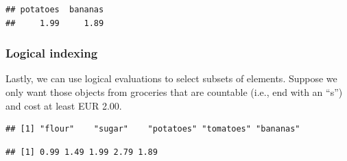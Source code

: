 \documentclass[
  11pt,
]{article}
\newenvironment{Shaded}{\begin{snugshade}}{\end{snugshade}}
\newcommand{\CommentTok}[1]{\textcolor[rgb]{0.56,0.35,0.01}{\textit{#1}}}
\newcommand{\FloatTok}[1]{\textcolor[rgb]{0.00,0.00,0.81}{#1}}
\newcommand{\FunctionTok}[1]{\textcolor[rgb]{0.13,0.29,0.53}{\textbf{#1}}}
\newcommand{\NormalTok}[1]{#1}
\newcommand{\OtherTok}[1]{\textcolor[rgb]{0.56,0.35,0.01}{#1}}
\newcommand{\SpecialCharTok}[1]{\textcolor[rgb]{0.81,0.36,0.00}{\textbf{#1}}}
\newcommand{\StringTok}[1]{\textcolor[rgb]{0.31,0.60,0.02}{#1}}
\begin{document}
\begin{verbatim}
## potatoes  bananas 
##     1.99     1.89
\end{verbatim}

\hypertarget{logical-indexing}{%
\subsubsection{Logical indexing}\label{logical-indexing}}

Lastly, we can use logical evaluations to select subsets of elements. Suppose we only want those objects from groceries that are countable (i.e., end with an ``s'') and cost at least EUR 2.00.

\begin{Shaded}
\end{Shaded}

\begin{verbatim}
## [1] "flour"    "sugar"    "potatoes" "tomatoes" "bananas"
\end{verbatim}

\begin{Shaded}
\end{Shaded}

\begin{verbatim}
## [1] 0.99 1.49 1.99 2.79 1.89
\end{verbatim}

\begin{Shaded}
\end{Shaded}
\end{document}
